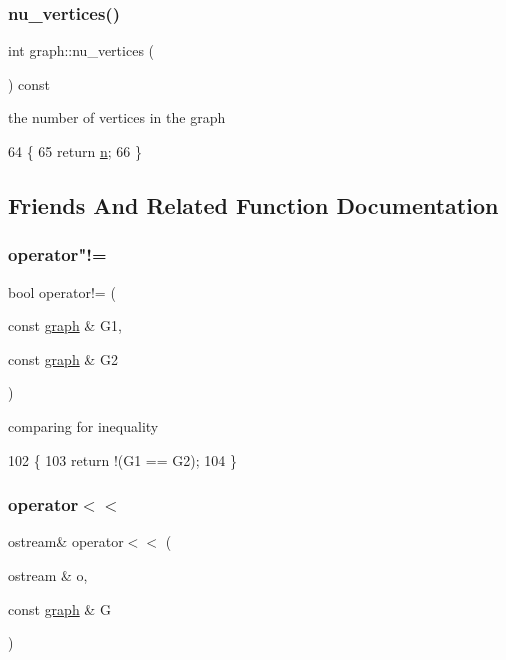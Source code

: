 \subsubsection{\texorpdfstring{nu\+\_\+vertices()}{nu\_vertices()}}
{\footnotesize\ttfamily int graph\+::nu\+\_\+vertices (\begin{DoxyParamCaption}{ }\end{DoxyParamCaption}) const}



the number of vertices in the graph 


\begin{DoxyCode}
64                             \{
65   \textcolor{keywordflow}{return} \hyperlink{classgraph_ac8b3474ce95c04087c312508ec1443b6}{n};
66 \}
\end{DoxyCode}


\subsection{Friends And Related Function Documentation}
\mbox{\label{classgraph_a004e2b491d4bafaf2d8129e6bc8abc2e}} 
\subsubsection{\texorpdfstring{operator"!=}{operator!=}}
{\footnotesize\ttfamily bool operator!= (\begin{DoxyParamCaption}\item[{const \hyperlink{classgraph}{graph} \&}]{G1,  }\item[{const \hyperlink{classgraph}{graph} \&}]{G2 }\end{DoxyParamCaption})\hspace{0.3cm}{\ttfamily [friend]}}



comparing for inequality 


\begin{DoxyCode}
102 \{
103   \textcolor{keywordflow}{return} !(G1 == G2);
104 \}
\end{DoxyCode}
\mbox{\label{classgraph_abe8832440fa24b6a6c152dbc3736c908}} 
\subsubsection{\texorpdfstring{operator$<$$<$}{operator<<}}
{\footnotesize\ttfamily ostream\& operator$<$$<$ (\begin{DoxyParamCaption}\item[{ostream \&}]{o,  }\item[{const \hyperlink{classgraph}{graph} \&}]{G }\end{DoxyParamCaption})\hspace{0.3cm}{\ttfamily [friend]}}



